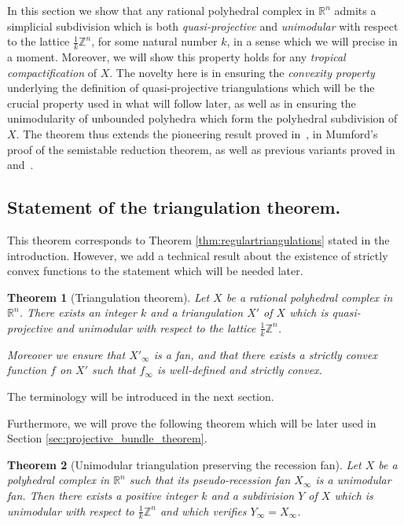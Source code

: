 \documentclass[11pt]{amsart}
\newtheorem{thm}{Theorem}[section]
\theoremstyle{definition}
\numberwithin{equation}{section}
\renewcommand{\~}{\widetilde}
\newcommand{\Z}{\mathbb{Z}}
\newcommand{\R}{\mathbb{R}}
\begin{document}
In this section we show that any rational polyhedral complex in $\R^n$ admits a simplicial subdivision which is both \emph{quasi-projective} and \emph{unimodular} with respect to the lattice $\frac 1k \Z^n$, for some natural number $k$, in a sense which we will precise in a moment. Moreover, we will show this property holds for any \emph{tropical compactification} of $X$. The novelty here is in ensuring the \emph{convexity property} underlying the definition of quasi-projective triangulations which will be the crucial property used in what will follow later, as well as in ensuring the unimodularity of unbounded polyhedra which form the polyhedral subdivision of $X$. The theorem thus extends the pioneering result proved in~\cite{KKMS}, in Mumford's proof of the semistable reduction theorem, as well as previous variants proved in~\cite{IKMZ} and~\cite{Wlo97}.



\subsection{Statement of the triangulation theorem.}

This theorem corresponds to Theorem \ref{thm:regulartriangulations} stated in the introduction. However, we add a technical result about the existence of strictly convex functions to the statement which  will be needed later.

\begin{thm}[Triangulation theorem] \label{thm:triangulation_unimodulaire_convexe}
Let $X$ be a rational polyhedral complex in $\R^n$. There exists an integer $k$ and a triangulation $X'$ of $X$ which is quasi-projective and unimodular with respect to the lattice $\frac 1k \Z^n$.

Moreover we ensure that $X'_\infty$ is a fan, and that there exists a strictly convex function $f$ on $X'$ such that $f_\infty$ is well-defined and strictly convex.
\end{thm}
The terminology will be introduced in the next section.

\medskip

Furthermore, we will prove the following theorem which will be later used in Section \ref{sec:projective_bundle_theorem}.

\begin{thm}[Unimodular triangulation preserving the recession fan] \label{thm:unimodular_preserving_recession}
Let $X$ be a polyhedral complex in $\R^n$ such that its pseudo-recession fan $X_\infty$ is a unimodular fan. Then there exists a positive integer $k$ and a subdivision $Y$ of $X$ which is unimodular with respect to $\frac1k\Z^n$ and which verifies $Y_\infty=X_\infty$.
\end{thm}
\end{document}
